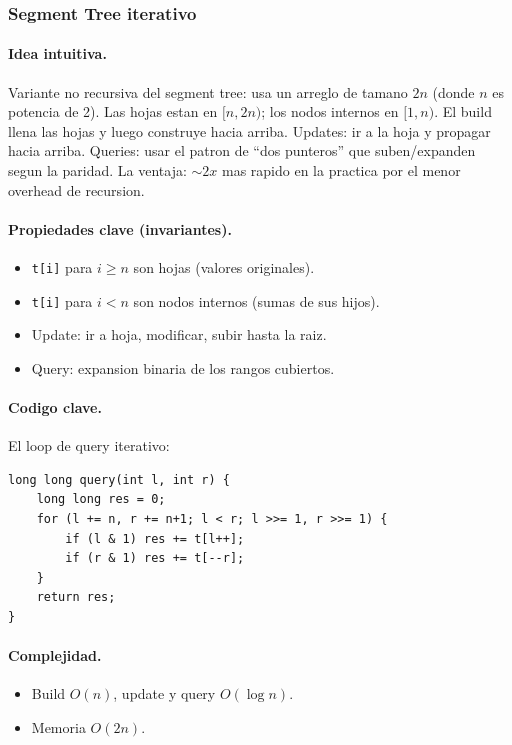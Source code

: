 \subsubsection{Segment Tree iterativo}

\paragraph{Idea intuitiva.}
Variante no recursiva del segment tree: usa un arreglo de tamano $2n$ (donde $n$ es potencia de 2). Las hojas estan en $[n, 2n)$; los nodos internos en $[1, n)$. El build llena las hojas y luego construye hacia arriba. Updates: ir a la hoja y propagar hacia arriba. Queries: usar el patron de ``dos punteros'' que suben/expanden segun la paridad. La ventaja: $\sim 2x$ mas rapido en la practica por el menor overhead de recursion.

\paragraph{Propiedades clave (invariantes).}
\begin{itemize}\setlength\itemsep{0pt}
	\item \texttt{t[i]} para $i \ge n$ son hojas (valores originales).
	\item \texttt{t[i]} para $i < n$ son nodos internos (sumas de sus hijos).
	\item Update: ir a hoja, modificar, subir hasta la raiz.
	\item Query: expansion binaria de los rangos cubiertos.
\end{itemize}

\paragraph{Codigo clave.}
El loop de query iterativo:
\begin{verbatim}
long long query(int l, int r) {
    long long res = 0;
    for (l += n, r += n+1; l < r; l >>= 1, r >>= 1) {
        if (l & 1) res += t[l++];
        if (r & 1) res += t[--r];
    }
    return res;
}
\end{verbatim}

\paragraph{Complejidad.}
\begin{itemize}\setlength\itemsep{0pt}
	\item Build $O(n)$, update y query $O(\log n)$.
	\item Memoria $O(2n)$.
\end{itemize}


